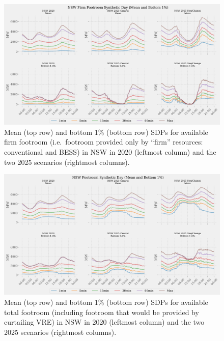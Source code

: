 \documentclass[12pt,a4paper,]{report}
\begin{document}
\begin{figure}
\hypertarget{fig:nswfirmfoot}{%
\centering
\includegraphics[width=1\textwidth,height=\textheight]{./source/figures/NSW_firmfootroom_all_profiles_by_di.png}
\caption[NSW firm footroom SDPs]{Mean (top row) and bottom 1\% (bottom
row) SDPs for available firm footroom (i.e.~footroom provided only by
``firm'' resources: conventional and BESS) in NSW in 2020 (leftmost
column) and the two 2025 scenarios (rightmost
columns).}\label{fig:nswfirmfoot}
}
\end{figure}

\begin{figure}
\hypertarget{fig:nswfoot}{%
\centering
\includegraphics[width=1\textwidth,height=\textheight]{./source/figures/NSW_footroom_all_profiles_by_di.png}
\caption[NSW footroom SDPs]{Mean (top row) and bottom 1\% (bottom row)
SDPs for available total footroom (including footroom that would be
provided by curtailing VRE) in NSW in 2020 (leftmost column) and the two
2025 scenarios (rightmost columns).}\label{fig:nswfoot}
}
\end{figure}
\end{document}
